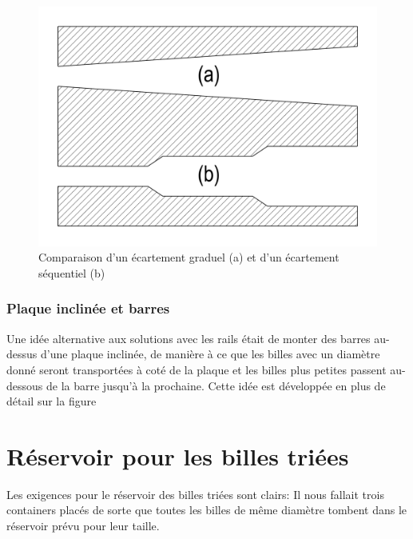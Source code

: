 \begin{figure}
    \centering
    \includegraphics[width=\textwidth]{Graphics/Rails/ECARTEMENTS.pdf}
    \caption{Comparaison d'un écartement graduel (a) et d'un écartement séquentiel (b)}
\end{figure}

\subsubsection{Plaque inclinée et barres}
Une idée alternative aux solutions avec les rails était de monter des barres au-dessus d'une plaque inclinée, de manière à ce que les billes avec un diamètre donné seront transportées à coté de la plaque et les billes plus petites passent au-dessous de la barre jusqu'à la prochaine. Cette idée est développée en plus de détail sur la figure %



\section{Réservoir pour les billes triées}
Les exigences pour le réservoir des billes triées sont clairs: Il nous fallait trois containers placés de sorte que toutes les billes de même diamètre tombent dans le réservoir prévu pour leur taille.


